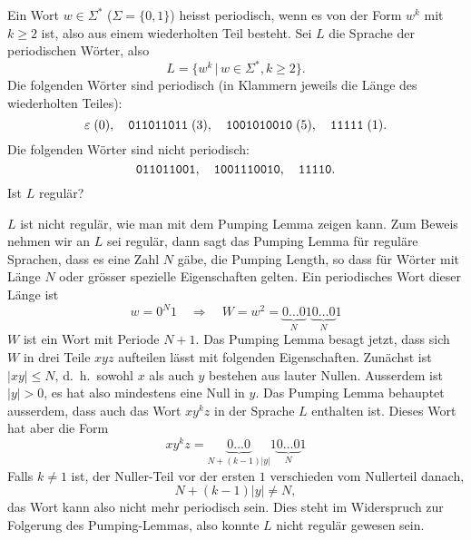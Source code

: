 Ein Wort $w\in\Sigma^*$ ($\Sigma=\{0,1\}$) heisst periodisch, wenn
es von der Form $w^k$ mit $k\ge 2$  ist, also aus einem wiederholten
Teil besteht. Sei $L$ die Sprache der periodischen Wörter, also
\[
L=\{w^k \,|\,w\in\Sigma^*,k\ge 2\}.
\]
Die folgenden Wörter sind periodisch (in Klammern jeweils die Länge
des wiederholten Teiles):
\[
\varepsilon\;(0),\quad
\text{\tt 011011011}\;(3),\quad
\text{\tt 1001010010}\;(5),\quad
\text{\tt 11111}\;(1).
\]
Die folgenden Wörter sind nicht periodisch:
\[
\text{\tt 011011001},\quad
\text{\tt 1001110010},\quad
\text{\tt 11110}.
\]
Ist $L$ regulär?

\begin{loesung}
$L$ ist nicht regulär, wie man mit dem Pumping Lemma zeigen kann. Zum Beweis
nehmen wir an $L$ sei regulär, dann sagt das Pumping Lemma für
reguläre Sprachen, dass es
eine Zahl $N$ gäbe, die Pumping Length, so dass für Wörter mit
Länge $N$ oder grösser spezielle Eigenschaften gelten.
Ein periodisches Wort dieser Länge ist
\[
w=0^N1\quad\Rightarrow\quad
W=w^2=\underbrace{0\dots 0}_N1\underbrace{0\dots 0}_N1
\]
$W$ ist ein Wort mit Periode $N+1$. Das Pumping Lemma besagt jetzt, dass
sich $W$ in drei Teile $xyz$ aufteilen lässt mit folgenden Eigenschaften.
Zunächst ist $|xy|\le N$, d.~h.~sowohl $x$ als auch $y$ bestehen aus
lauter Nullen. Ausserdem ist $|y|>0$, es hat also mindestens eine Null
in $y$. Das Pumping Lemma behauptet ausserdem, dass auch das Wort
$xy^kz$ in der Sprache $L$ enthalten ist. Dieses Wort hat aber die
Form
\[
xy^kz=\underbrace{0\dots0}_{N+(k-1)|y|}1\underbrace{0\dots 0}_N1
\]
Falls $k\ne 1$ ist, der Nuller-Teil vor der ersten $1$ verschieden vom
Nullerteil danach,
\[
N+(k-1)|y|\ne N,
\]
das Wort kann also nicht mehr periodisch
sein. Dies steht im Widerspruch zur Folgerung des Pumping-Lemmas, also
konnte $L$ nicht regulär gewesen sein.
\end{loesung}
